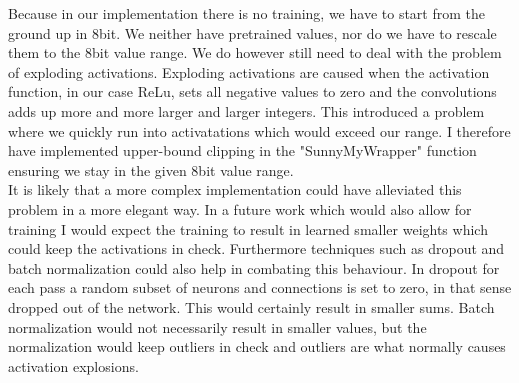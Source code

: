 \documentclass[]{IEEEtran}
\begin{document}
Because in our implementation there is no training, we have to start from the ground up in 8bit. We neither have pretrained values, nor do we have to rescale them to the 8bit value range. We do however still need to deal with the problem of exploding activations. Exploding activations are caused when the activation function, in our case ReLu, sets all negative values to zero and the convolutions adds up more and more larger and larger integers. This introduced a problem where we quickly run into activatations which would exceed our range. I therefore have implemented upper-bound clipping in the "SunnyMyWrapper" function ensuring we stay in the given 8bit value range.\\
It is likely that a more complex implementation could have alleviated this problem in a more elegant way. In a future work which would also allow for training I would expect the training to result in learned smaller weights which could keep the activations in check. Furthermore techniques such as dropout and batch normalization could also help in combating this behaviour. In dropout for each pass a random subset of neurons and connections is set to zero, in that sense dropped out of the network. This would certainly result in smaller sums. Batch normalization would not necessarily result in smaller values, but the normalization would keep outliers in check and outliers are what normally causes activation explosions. 
\end{document}
